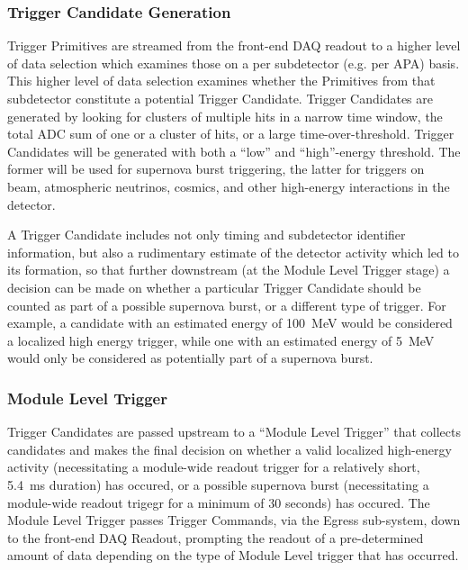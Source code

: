 
\subsubsection{Trigger Candidate Generation}

Trigger Primitives are streamed from the front-end DAQ readout to a
higher level of data selection which examines those on a per
subdetector (e.g. per APA) basis. This higher level of data selection examines
whether the Primitives from that subdetector constitute a potential
Trigger Candidate. Trigger Candidates are generated by looking for
clusters of multiple hits in a narrow time window, the total ADC sum of one or a
cluster of hits, or a large time-over-threshold. Trigger 
Candidates will be generated with both a “low” and “high”-energy threshold. The former
will be used for supernova burst triggering, the latter for triggers on beam, atmospheric
neutrinos, cosmics, and other high-energy interactions in the detector. 

A Trigger Candidate includes not only timing and subdetector
identifier information, but also a rudimentary estimate of the detector
activity which led to its formation, so that further downstream (at
the Module Level Trigger stage) a decision can be made on 
whether a particular Trigger Candidate should be counted as part of a possible supernova
burst, or a different type of trigger. For example,
a candidate with an estimated energy of 100~MeV would be considered a
localized high energy trigger, while
one with an estimated energy of 5~MeV would only be considered as potentially part of a
supernova burst.

\subsubsection{Module Level Trigger}
Trigger Candidates are passed upstream to a “Module Level Trigger'' that collects candidates
and makes the final decision on whether a valid localized high-energy
activity (necessitating a module-wide readout trigger for a relatively
short, 5.4~ms duration) has occured,
or a possible supernova burst (necessitating a module-wide readout
trigegr for a minimum of 30 seconds) has occured. The Module Level Trigger passes
Trigger Commands, via the Egress sub-system, down to the front-end DAQ
Readout, prompting the readout of a pre-determined amount of data depending
on the type of Module Level trigger that has occurred. 

